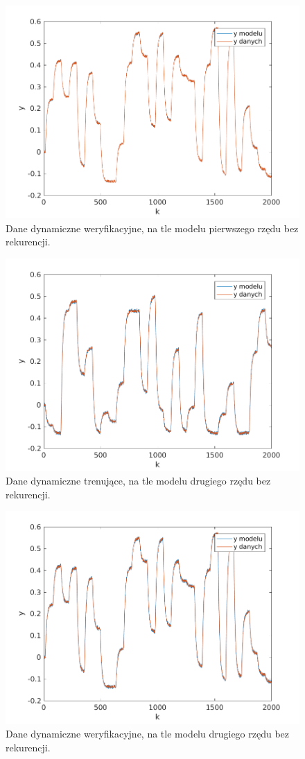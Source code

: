\documentclass{article}
\begin{document}
\begin{figure}
	\centering
	\includegraphics[width=0.7\linewidth]{../dane_dynamiczne/model_bez_rek_walid_1}
	\caption{Dane dynamiczne weryfikacyjne, na tle modelu pierwszego rzędu bez rekurencji.}
	\label{fig:model_bez_rek_walid_1}
\end{figure}

\begin{figure}
	\centering
	\includegraphics[width=0.7\linewidth]{../dane_dynamiczne/model_bez_rek_train_2}
	\caption{Dane dynamiczne trenujące, na tle modelu drugiego rzędu bez rekurencji.}
	\label{fig:model_bez_rek_train_2}
\end{figure}

\begin{figure}
	\centering
	\includegraphics[width=0.7\linewidth]{../dane_dynamiczne/model_bez_rek_walid_2}
	\caption{Dane dynamiczne weryfikacyjne, na tle modelu drugiego rzędu bez rekurencji.}
	\label{fig:model_bez_rek_walid_2}
\end{figure}
\end{document}
